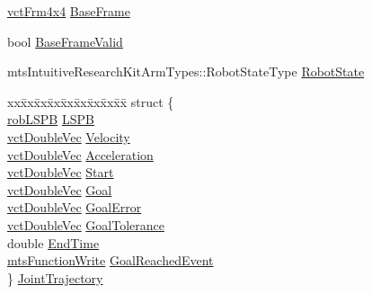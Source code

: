 \begin{DoxyCompactItemize}
\item 
\hyperlink{vct_transformation_types_8h_a33da47f4deb2556b37a69a2c44b29d75}{vct\-Frm4x4} \hyperlink{classmts_intuitive_research_kit_arm_ade596240dde13e6603f34926fb5cf9ed}{Base\-Frame}
\item 
bool \hyperlink{classmts_intuitive_research_kit_arm_ab93ef9746131a595e486c0aa5d7d4d22}{Base\-Frame\-Valid}
\item 
mts\-Intuitive\-Research\-Kit\-Arm\-Types\-::\-Robot\-State\-Type \hyperlink{classmts_intuitive_research_kit_arm_a228b8565cffee0c6d9b1c756d0f0deec}{Robot\-State}
\item 
\begin{tabbing}
xx\=xx\=xx\=xx\=xx\=xx\=xx\=xx\=xx\=\kill
struct \{\\
\>\hyperlink{classrob_l_s_p_b}{robLSPB} \hyperlink{classmts_intuitive_research_kit_arm_a9643169688f8e9ab2a85bead9d5c9300}{LSPB}\\
\>\hyperlink{vct_dynamic_vector_types_8h_ade4b3068c86fb88f41af2e5187e491c2}{vctDoubleVec} \hyperlink{classmts_intuitive_research_kit_arm_a54046b45c03a94fcacb9a3b335a19c0a}{Velocity}\\
\>\hyperlink{vct_dynamic_vector_types_8h_ade4b3068c86fb88f41af2e5187e491c2}{vctDoubleVec} \hyperlink{classmts_intuitive_research_kit_arm_aeab53c900044d1cf53107b06a2216c7d}{Acceleration}\\
\>\hyperlink{vct_dynamic_vector_types_8h_ade4b3068c86fb88f41af2e5187e491c2}{vctDoubleVec} \hyperlink{classmts_intuitive_research_kit_arm_a94cbc8bebf4566ca94cb03cc007186f7}{Start}\\
\>\hyperlink{vct_dynamic_vector_types_8h_ade4b3068c86fb88f41af2e5187e491c2}{vctDoubleVec} \hyperlink{classmts_intuitive_research_kit_arm_ab8b3ea821aed3be80e1a809bb684a255}{Goal}\\
\>\hyperlink{vct_dynamic_vector_types_8h_ade4b3068c86fb88f41af2e5187e491c2}{vctDoubleVec} \hyperlink{classmts_intuitive_research_kit_arm_a74155dcbfb69272c3babae70ae0edb38}{GoalError}\\
\>\hyperlink{vct_dynamic_vector_types_8h_ade4b3068c86fb88f41af2e5187e491c2}{vctDoubleVec} \hyperlink{classmts_intuitive_research_kit_arm_a3ffd256e671710371a02aeb18e532c9d}{GoalTolerance}\\
\>double \hyperlink{classmts_intuitive_research_kit_arm_a3481873c8bd31844a5fa40cf30fb738f}{EndTime}\\
\>\hyperlink{classmts_function_write}{mtsFunctionWrite} \hyperlink{classmts_intuitive_research_kit_arm_adcb236f60c9cc9e7f390c4df4f4c00ca}{GoalReachedEvent}\\
\} \hyperlink{classmts_intuitive_research_kit_arm_a7e8469df0c4afe57a12ffed0bc1b17f2}{JointTrajectory}\\


\end{tabbing}
\end{DoxyCompactItemize}
